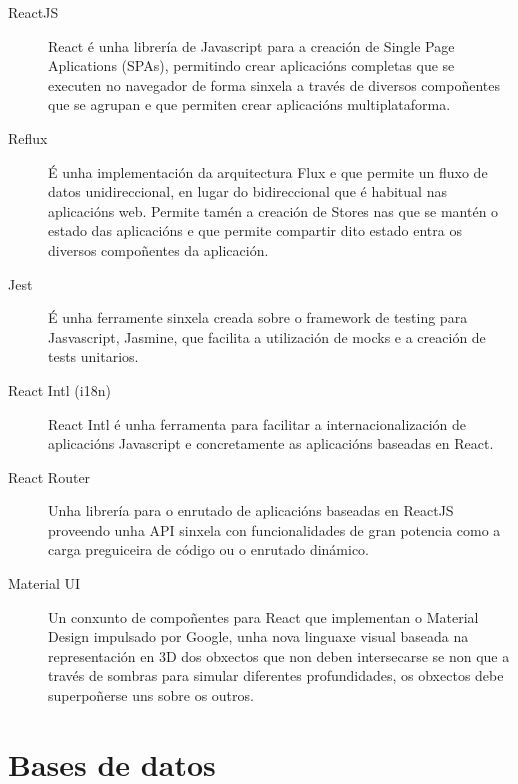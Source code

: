   \begin{description}
   \item [ReactJS]\cite{web:react} React é unha librería de Javascript para a 
creación de Single Page Aplications (SPAs), permitindo crear aplicacións 
completas que se executen no navegador de forma sinxela a través de diversos 
compoñentes que se agrupan e que permiten crear aplicacións multiplataforma.

   \item [Reflux]\cite{web:reflux} É unha implementación da 
arquitectura Flux e que permite un fluxo de datos unidireccional, en lugar do 
bidireccional que é habitual nas aplicacións web.
    Permite tamén a creación de Stores nas que se mantén o estado das aplicacións e que 
permite compartir dito estado entra os diversos compoñentes da aplicación.

   \item [Jest]\cite{web:jest} É unha ferramente sinxela creada sobre o 
framework de testing para Jasvascript, Jasmine, que facilita a utilización de 
mocks e a creación de tests unitarios.

   \item [React Intl (i18n)]\cite{web:reactintl} React Intl é unha 
ferramenta para facilitar a internacionalización de aplicacións Javascript e 
concretamente as 
aplicacións baseadas en React.

   \item [React Router]\cite{web:reactrouter} Unha 
librería para o enrutado de aplicacións baseadas en ReactJS 
proveendo unha API sinxela con funcionalidades de gran potencia como a carga preguiceira 
de código ou o enrutado dinámico.

   \item [Material UI]\cite{web:materialui} Un conxunto de 
compoñentes para React que implementan o Material 
Design impulsado por Google, unha nova linguaxe visual baseada na representación en 3D 
dos obxectos que non deben intersecarse se non que a través de sombras para simular 
diferentes profundidades, os obxectos debe superpoñerse uns sobre os outros.

  \end{description}

  \section{Bases de datos}


